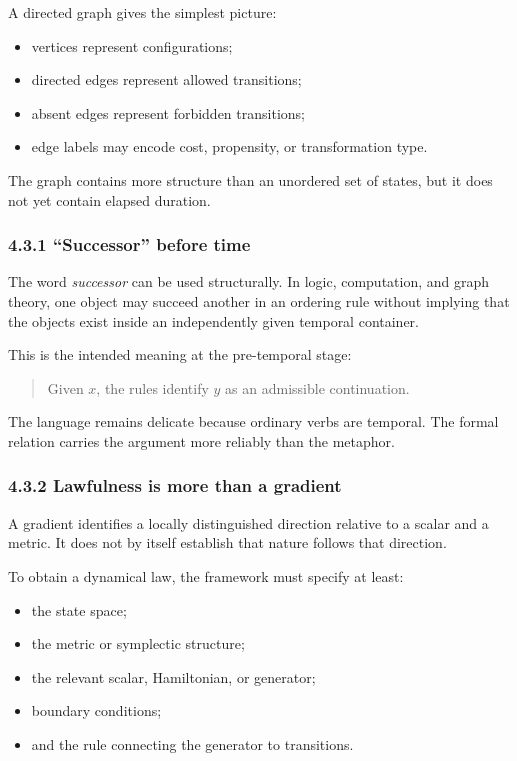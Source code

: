 \documentclass[
  11pt,
]{article}
\providecommand{\tightlist}{%
  \setlength{\itemsep}{0pt}\setlength{\parskip}{0pt}}
\begin{document}
A directed graph gives the simplest picture:

\begin{itemize}
\tightlist
\item
  vertices represent configurations;
\item
  directed edges represent allowed transitions;
\item
  absent edges represent forbidden transitions;
\item
  edge labels may encode cost, propensity, or transformation type.
\end{itemize}

The graph contains more structure than an unordered set of states, but
it does not yet contain elapsed duration.

\subsubsection{4.3.1 ``Successor'' before
time}\label{successor-before-time}

The word \emph{successor} can be used structurally. In logic,
computation, and graph theory, one object may succeed another in an
ordering rule without implying that the objects exist inside an
independently given temporal container.

This is the intended meaning at the pre-temporal stage:

\begin{quote}
Given \(x\), the rules identify \(y\) as an admissible continuation.
\end{quote}

The language remains delicate because ordinary verbs are temporal. The
formal relation carries the argument more reliably than the metaphor.

\subsubsection{4.3.2 Lawfulness is more than a
gradient}\label{lawfulness-is-more-than-a-gradient}

A gradient identifies a locally distinguished direction relative to a
scalar and a metric. It does not by itself establish that nature follows
that direction.

To obtain a dynamical law, the framework must specify at least:

\begin{itemize}
\tightlist
\item
  the state space;
\item
  the metric or symplectic structure;
\item
  the relevant scalar, Hamiltonian, or generator;
\item
  boundary conditions;
\item
  and the rule connecting the generator to transitions.
\end{itemize}
\end{document}
